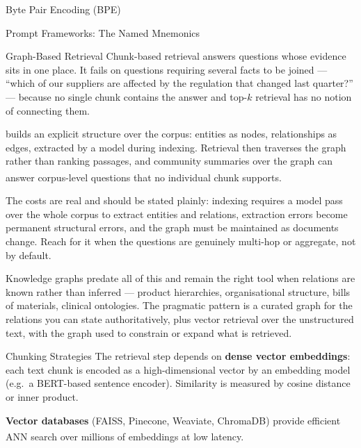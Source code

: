 \begin{v3topic}{Byte Pair Encoding (BPE)}
\begin{v3topic}{Prompt Frameworks: The Named Mnemonics}
\begin{v3topic}{Graph-Based Retrieval}
    Chunk-based retrieval answers questions whose evidence sits in one place.
    It fails on questions requiring several facts to be joined --- ``which of
    our suppliers are affected by the regulation that changed last quarter?''
    --- because no single chunk contains the answer and top-$k$ retrieval has
    no notion of connecting them.

     builds an explicit structure over the
    corpus: entities as nodes, relationships as edges, extracted by a model
    during indexing. Retrieval then traverses the graph rather than ranking
    passages, and community summaries over the graph can answer corpus-level
    questions that no individual chunk
    supports\textsuperscript{\cite{edgeLocalGlobalGraph2024}}.

    The costs are real and should be stated plainly: indexing requires a model
    pass over the whole corpus to extract entities and relations, extraction
    errors become permanent structural errors, and the graph must be
    maintained as documents change. Reach for it when the questions are
    genuinely multi-hop or aggregate, not by default.

\begin{engineernote}
Knowledge graphs predate all of this and remain the right tool when relations
are known rather than inferred --- product hierarchies, organisational
structure, bills of materials, clinical ontologies. The pragmatic pattern is a
curated graph for the relations you can state authoritatively, plus vector
retrieval over the unstructured text, with the graph used to constrain or
expand what is retrieved.
\end{engineernote}
\end{v3topic}

\begin{v3topic}{Chunking Strategies}
    The retrieval step depends on \textbf{dense vector embeddings}: each text chunk is
    encoded as a high-dimensional vector by an embedding model (e.g.\ a BERT-based
    sentence encoder). Similarity is measured by cosine distance or inner product.

    \textbf{Vector databases} (FAISS, Pinecone, Weaviate, ChromaDB) provide efficient ANN
    search over millions of embeddings at low
    latency.\textsuperscript{\cite[][p.~83]{farrisHowLargeLanguage2025}}


\end{v3topic}
\end{v3topic}
\end{v3topic}
